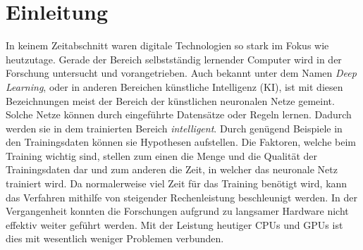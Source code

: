 \chapter{Einleitung}\label{s.einleitung} 
In keinem Zeitabschnitt waren digitale Technologien so stark im Fokus wie heutzutage. Gerade der Bereich selbstständig lernender Computer wird in der Forschung untersucht und vorangetrieben. Auch bekannt unter dem Namen \textit{Deep Learning}, oder  in anderen Bereichen künstliche Intelligenz (KI), ist mit diesen Bezeichnungen meist der Bereich der künstlichen neuronalen Netze gemeint. Solche Netze können durch eingeführte Datensätze oder Regeln lernen. Dadurch werden sie in dem trainierten Bereich \textit{intelligent}. Durch genügend Beispiele in den Trainingsdaten können sie Hypothesen aufstellen. Die Faktoren, welche beim Training wichtig sind, stellen zum einen die Menge und die Qualität der Trainingsdaten dar und zum anderen die Zeit, in welcher das neuronale Netz trainiert wird. Da normalerweise viel Zeit für das Training benötigt wird, kann das Verfahren mithilfe von steigender Rechenleistung beschleunigt werden. In der Vergangenheit konnten die Forschungen aufgrund zu langsamer Hardware nicht effektiv weiter geführt werden. Mit der Leistung heutiger CPUs und GPUs ist dies mit wesentlich weniger Problemen verbunden.

